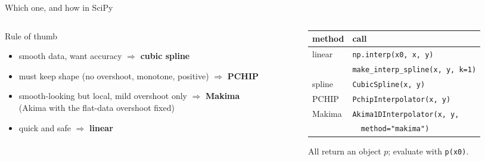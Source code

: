 \documentclass[aspectratio=169]{beamer}
\begin{document}
\begin{frame}[fragile]{Which one, and how in SciPy}
\begin{columns}[T]
\begin{column}{0.48\textwidth}
\small
\begin{exampleblock}{Rule of thumb}
\begin{itemize}
\item smooth data, want accuracy $\Rightarrow$ \textbf{cubic spline}
\item must keep shape (no overshoot, monotone, positive) $\Rightarrow$ \textbf{PCHIP}
\item smooth-looking but local, mild overshoot only $\Rightarrow$ \textbf{Makima}\\
{\footnotesize (Akima with the flat-data overshoot fixed)}
\item quick and safe $\Rightarrow$ \textbf{linear}
\end{itemize}
\end{exampleblock}
\end{column}
\begin{column}{0.50\textwidth}
\footnotesize
\begin{tabular}{@{}ll@{}}
\toprule
method & call \\ \midrule
linear & \texttt{np.interp(x0, x, y)} \\
       & \texttt{make\_interp\_spline(x, y, k=1)} \\
spline & \texttt{CubicSpline(x, y)} \\
PCHIP  & \texttt{PchipInterpolator(x, y)} \\
Makima & \texttt{Akima1DInterpolator(x, y,} \\
       & \texttt{\ \ method="makima")} \\
\bottomrule
\end{tabular}

\vspace{0.4em}
All return an object $p$; evaluate with \texttt{p(x0)}.
\end{column}
\end{columns}
\end{frame}
\end{document}
